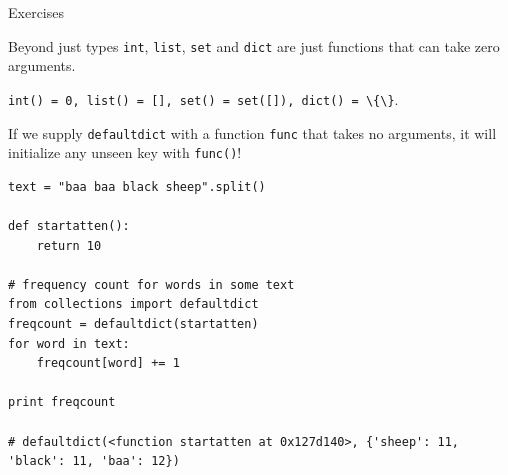 \documentclass{beamer}
\begin{document}
\begin{frame}{Exercises}
\end{frame}


\begin{frame}{Beyond just types}
 \lstinline$int$, \lstinline$list$, \lstinline$set$ and \lstinline$dict$ are just functions that can take zero arguments.

 \bigskip 
 
 \lstinline$int() = 0, list() = [], set() = set([]), dict() = \{\}$.

 \bigskip

 If we supply \lstinline$defaultdict$ with a function \lstinline$func$ that takes no arguments,
 it will initialize any unseen key with \lstinline$func()$!
\end{frame}

\begin{lrbox}{\mysavebox}
\begin{lstlisting}
text = "baa baa black sheep".split()

def startatten():
    return 10

# frequency count for words in some text
from collections import defaultdict
freqcount = defaultdict(startatten)
for word in text:
    freqcount[word] += 1

print freqcount 

# defaultdict(<function startatten at 0x127d140>, {'sheep': 11, 'black': 11, 'baa': 12})

\end{lstlisting}
\end{lrbox}
\end{document}
